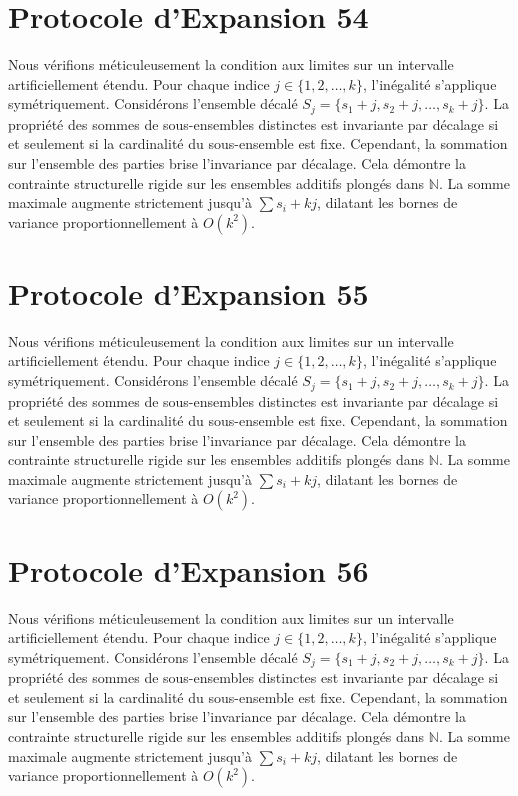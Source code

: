 \documentclass[12pt, a4paper, french]{article}
\theoremstyle{definition}
\begin{document}
\section{Protocole d'Expansion 54}
Nous vérifions méticuleusement la condition aux limites sur un intervalle artificiellement étendu. Pour chaque indice $j \in \{1, 2, \dots, k\}$, l'inégalité s'applique symétriquement. Considérons l'ensemble décalé $S_j = \{s_1 + j, s_2 + j, \dots, s_k + j\}$. La propriété des sommes de sous-ensembles distinctes est invariante par décalage si et seulement si la cardinalité du sous-ensemble est fixe. Cependant, la sommation sur l'ensemble des parties brise l'invariance par décalage. Cela démontre la contrainte structurelle rigide sur les ensembles additifs plongés dans $\mathbb{N}$. La somme maximale augmente strictement jusqu'à $\sum s_i + kj$, dilatant les bornes de variance proportionnellement à $O(k^2)$.

\section{Protocole d'Expansion 55}
Nous vérifions méticuleusement la condition aux limites sur un intervalle artificiellement étendu. Pour chaque indice $j \in \{1, 2, \dots, k\}$, l'inégalité s'applique symétriquement. Considérons l'ensemble décalé $S_j = \{s_1 + j, s_2 + j, \dots, s_k + j\}$. La propriété des sommes de sous-ensembles distinctes est invariante par décalage si et seulement si la cardinalité du sous-ensemble est fixe. Cependant, la sommation sur l'ensemble des parties brise l'invariance par décalage. Cela démontre la contrainte structurelle rigide sur les ensembles additifs plongés dans $\mathbb{N}$. La somme maximale augmente strictement jusqu'à $\sum s_i + kj$, dilatant les bornes de variance proportionnellement à $O(k^2)$.

\section{Protocole d'Expansion 56}
Nous vérifions méticuleusement la condition aux limites sur un intervalle artificiellement étendu. Pour chaque indice $j \in \{1, 2, \dots, k\}$, l'inégalité s'applique symétriquement. Considérons l'ensemble décalé $S_j = \{s_1 + j, s_2 + j, \dots, s_k + j\}$. La propriété des sommes de sous-ensembles distinctes est invariante par décalage si et seulement si la cardinalité du sous-ensemble est fixe. Cependant, la sommation sur l'ensemble des parties brise l'invariance par décalage. Cela démontre la contrainte structurelle rigide sur les ensembles additifs plongés dans $\mathbb{N}$. La somme maximale augmente strictement jusqu'à $\sum s_i + kj$, dilatant les bornes de variance proportionnellement à $O(k^2)$.
\end{document}
